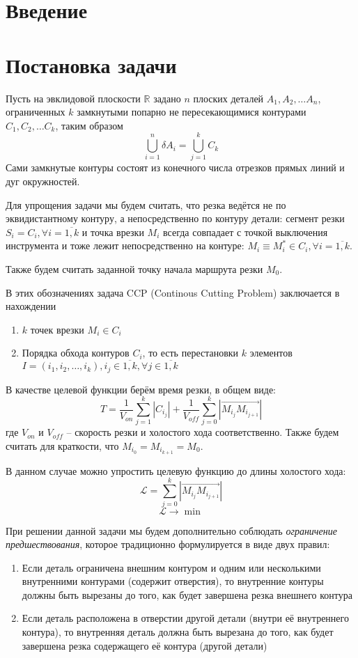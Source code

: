 \documentclass{article}
\begin{document}
\section{Введение}

\section{Постановка задачи}

Пусть на эвклидовой плоскости
$\mathbb R$ задано $n$ плоских деталей
$A_1, A_2, \dots A_n$,
ограниченных $k$ замкнутыми попарно не пересекающимися контурами
$C_1, C_2, \dots C_k$,
таким образом
$$
\bigcup_{i=1}^n \delta A_i = \bigcup_{j=1}^k C_k
$$
Сами замкнутые контуры состоят из конечного числа
отрезков прямых линий и дуг окружностей.

Для упрощения задачи мы будем считать,
что резка ведётся не по эквидистантному контуру,
а непосредственно по контуру детали:
сегмент резки
$S_i = C_i, \forall i=\overline{1, k}$
и точка врезки $M_i$ всегда совпадает с точкой выключения
инструмента и тоже лежит непосредственно
на контуре:
$M_i \equiv M_i^* \in C_i, \forall i = \overline{1, k}$.

Также будем считать заданной точку начала маршрута резки $M_0$.

В этих обозначениях задача CCP
(Continous Cutting Problem)
заключается в нахождении
\begin{enumerate}
    \item{$k$ точек врезки $M_i \in C_i$}
    \item{Порядка обхода контуров $C_i$,
    то есть перестановки $k$ элементов
    $I=(i_1, i_2, \dots, i_k),
    i_j \in \overline{1,k}, \forall j \in \overline{1,k}$}
\end{enumerate}

В качестве целевой функции берём время резки,
в общем виде:
$$
T = \frac{1}{V_{on}} \sum_{j=1}^k |C_{i_j}| +
\frac{1}{V_{off}} \sum_{j=0}^k |\overrightarrow{M_{i_j} M_{i_{{j+1}}}}|
$$
где $V_{on}$ и $V_{off}$ --
скорость резки и холостого хода соответственно. 
Также будем считать для краткости,
что
$M_{i_0} = M_{i_{k+1}} = M_0$.

В данном случае можно упростить целевую функцию
до длины холостого хода:
$$
\mathcal L = \sum_{j=0}^k |\overrightarrow{M_{i_j} M_{i_{{j+1}}}}|
$$
$$
\mathcal L \to \min
$$

При решении данной задачи мы будем дополнительно
соблюдать
\textit{ограничение предшествования},
которое традиционно формулируется в виде двух правил:
\begin{enumerate}
\item{}
Если деталь ограничена внешним контуром и одним
или несколькими внутренними контурами
(содержит отверстия),
то внутренние контуры должны
быть вырезаны до того,
как будет завершена резка внешнего контура
\item{}
Если деталь расположена в отверстии
другой детали
(внутри её внутреннего контура),
то внутренняя деталь
должна быть вырезана до того,
как будет завершена резка
содержащего её контура
(другой детали)
\end{enumerate}
\end{document}
